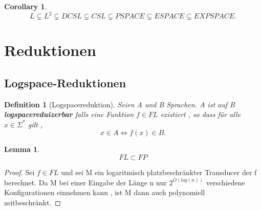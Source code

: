 \documentclass{article}
\newtheorem{definition}{Definition}[section]
\newtheorem{corollary}{Corollary}[theorem]
\newtheorem{lemma}[theorem]{Lemma}
\begin{document}
	\begin{corollary}
		\[
		L \subsetneq L^2 \subsetneq DCSL \subsetneq CSL \subsetneq PSPACE \subsetneq ESPACE \subsetneq EXPSPACE.
		\]
	\end{corollary}

	\section{Reduktionen}

	\subsection{Logspace-Reduktionen}

	\begin{definition}[Logspacereduktion] Seien A und B Sprachen. A ist auf B \textbf{logspacereduizerbar} falls eine Funktion $f \in FL$ existiert , so dass für alle $x \in \Sigma^*$ gilt , 
		\[
			x \in A \iff f(x) \in B.
		\]
	\end{definition}

	\begin{lemma}
		\[ FL \subset FP \]
	\end{lemma}
	\begin{proof}
		Sei $f \in FL $ und sei M ein logaritmisch platzbeschränkter Transducer der f berechnet. Da M bei einer Eingabe der Länge n nur $2^{O(log(n))}$ verschiedene Konfigurationen einnehmen kann , ist M dann auch polynomiell zeitbeschränkt.
		
	\end{proof}
		
\end{document}
